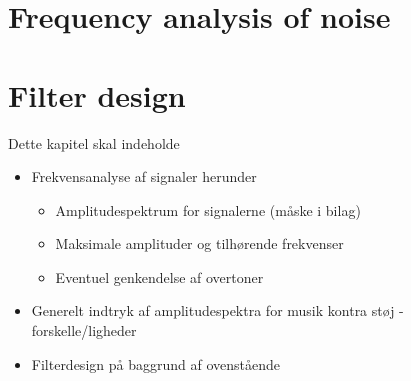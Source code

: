 \section{Frequency analysis of noise}


\section{Filter design}


\clearpage
Dette kapitel skal indeholde
\begin{itemize}
\item Frekvensanalyse af signaler herunder
\begin{itemize}
\item Amplitudespektrum for signalerne (måske i bilag)
\item Maksimale amplituder og tilhørende frekvenser
\item Eventuel genkendelse af overtoner
\end{itemize}
\item Generelt indtryk af amplitudespektra for musik kontra støj - forskelle/ligheder
\item Filterdesign på baggrund af ovenstående
\end{itemize}